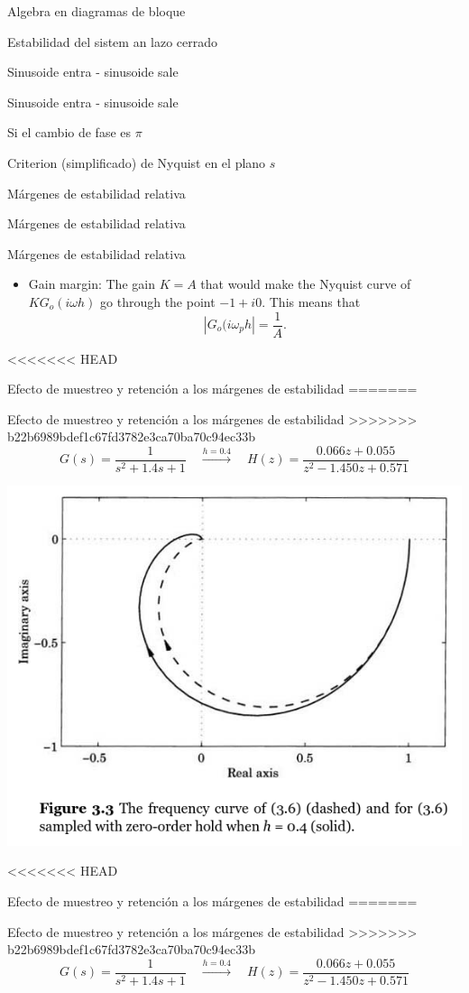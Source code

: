 \documentclass[presentation,aspectratio=169]{beamer}
\begin{document}
\begin{frame}[label={sec:org8e8e439}]{Algebra en diagramas de bloque}
\begin{frame}[label={sec:org5218f19}]{Estabilidad del sistem an lazo cerrado}
\begin{frame}[label={sec:org4ce2307}]{Sinusoide entra - sinusoide sale}
\begin{frame}[label={sec:orgc598966}]{Sinusoide entra - sinusoide sale}
\begin{frame}[label={sec:orgbd54147}]{Si el cambio de fase es \(\pi\)}
\begin{frame}[label={sec:orgf06388b}]{Criterion (simplificado) de Nyquist en el plano \(s\)}
\begin{frame}[label={sec:org5967884}]{Márgenes de estabilidad relativa}
\begin{frame}[label={sec:orgb5ba0e3}]{Márgenes de estabilidad relativa}
\begin{frame}[label={sec:orgf4be51c}]{Márgenes de estabilidad relativa}
\begin{itemize}
\item Gain margin: The gain \(K=A\) that would make the Nyquist curve of \(KG_o(i\omega h)\) go through the point \(-1 + i0\). This means that \[ |G_o(i\omega_p h| = \frac{1}{A}. \]
\end{itemize}
\end{frame}



<<<<<<< HEAD
\begin{frame}[label={sec:orga8344a9}]{Efecto de muestreo y retención a los márgenes de estabilidad}
=======
\begin{frame}[label={sec:org16cf443}]{Efecto de muestreo y retención a los márgenes de estabilidad}
>>>>>>> b22b6989bdef1c67fd3782e3ca70ba70c94ec33b
\[G(s) = \frac{1}{s^2 + 1.4s + 1} \quad \overset{h=0.4}{\longrightarrow} \quad H(z) = \frac{0.066z + 0.055}{z^2 - 1.450z + 0.571}\] 
\begin{center}
\includegraphics[width=0.6\linewidth]{../../figures/fig3-3.png}
\end{center}
\end{frame}
<<<<<<< HEAD
\begin{frame}[label={sec:org5e3653d}]{Efecto de muestreo y retención a los márgenes de estabilidad}
=======
\begin{frame}[label={sec:org77c163e}]{Efecto de muestreo y retención a los márgenes de estabilidad}
>>>>>>> b22b6989bdef1c67fd3782e3ca70ba70c94ec33b
\[G(s) = \frac{1}{s^2 + 1.4s + 1} \quad \overset{h=0.4}{\longrightarrow} \quad H(z) = \frac{0.066z + 0.055}{z^2 - 1.450z + 0.571}\] 
\begin{center}

\end{center}
\end{frame}
\end{frame}
\end{frame}
\end{frame}
\end{frame}
\end{frame}
\end{frame}
\end{frame}
\end{frame}
\end{frame}
\end{frame}
\end{document}
